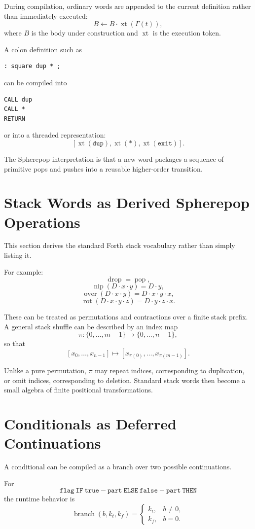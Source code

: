 \documentclass[12pt]{article}
\begin{document}
During compilation, ordinary words are appended to the current definition rather than immediately executed:
\[
B\gets B\cdot \operatorname{xt}(\Gamma(t)),
\]
where \(B\) is the body under construction and \(\operatorname{xt}\) is the execution token.

A colon definition such as
\begin{lstlisting}
: square dup * ;
\end{lstlisting}
can be compiled into
\begin{lstlisting}
CALL dup
CALL *
RETURN
\end{lstlisting}
or into a threaded representation:
\[
[\operatorname{xt}(\texttt{dup}), \operatorname{xt}(\texttt{*}), \operatorname{xt}(\texttt{exit})].
\]

The Spherepop interpretation is that a new word packages a sequence of primitive pops and pushes into a reusable higher-order transition.

\section{Stack Words as Derived Spherepop Operations}

This section derives the standard Forth stack vocabulary rather than simply listing it.

For example:
\[
\operatorname{drop} = \operatorname{pop},
\]
\[
\operatorname{nip}(D\cdot x\cdot y) = D\cdot y,
\]
\[
\operatorname{over}(D\cdot x\cdot y) = D\cdot x\cdot y\cdot x,
\]
\[
\operatorname{rot}(D\cdot x\cdot y\cdot z) = D\cdot y\cdot z\cdot x.
\]

These can be treated as permutations and contractions over a finite stack prefix. A general stack shuffle can be described by an index map
\[
\pi:\{0,\ldots,m-1\}\to\{0,\ldots,n-1\},
\]
so that
\[
[x_0,\ldots,x_{n-1}] \mapsto [x_{\pi(0)},\ldots,x_{\pi(m-1)}].
\]

Unlike a pure permutation, \(\pi\) may repeat indices, corresponding to duplication, or omit indices, corresponding to deletion. Standard stack words then become a small algebra of finite positional transformations.

\section{Conditionals as Deferred Continuations}

A conditional can be compiled as a branch over two possible continuations.

For
\[
\mathtt{flag\ IF\ true-part\ ELSE\ false-part\ THEN}
\]
the runtime behavior is
\[
\operatorname{branch}(b,k_t,k_f) =
\begin{cases}
k_t, & b\neq 0,\\
k_f, & b=0.
\end{cases}
\]
\end{document}

